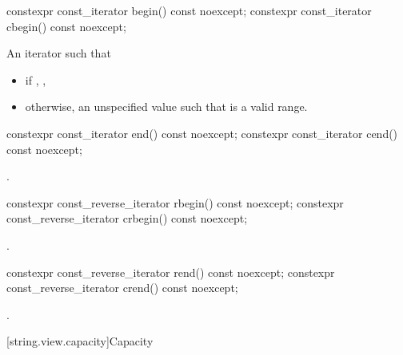 %
%
\begin{itemdecl}
constexpr const_iterator begin() const noexcept;
constexpr const_iterator cbegin() const noexcept;
\end{itemdecl}

\begin{itemdescr}
\pnum
\returns
An iterator such that
\begin{itemize}
\item if , ,
\item otherwise, an unspecified value such that  is a valid range.
\end{itemize}
\end{itemdescr}

%
%
\begin{itemdecl}
constexpr const_iterator end() const noexcept;
constexpr const_iterator cend() const noexcept;
\end{itemdecl}

\begin{itemdescr}
\pnum
\returns
{}.
\end{itemdescr}

%
%
\begin{itemdecl}
constexpr const_reverse_iterator rbegin() const noexcept;
constexpr const_reverse_iterator crbegin() const noexcept;
\end{itemdecl}

\begin{itemdescr}
\pnum
\returns
{}.
\end{itemdescr}

%
%
\begin{itemdecl}
constexpr const_reverse_iterator rend() const noexcept;
constexpr const_reverse_iterator crend() const noexcept;
\end{itemdecl}

\begin{itemdescr}
\pnum
\returns
{}.
\end{itemdescr}

[string.view.capacity]{Capacity}

